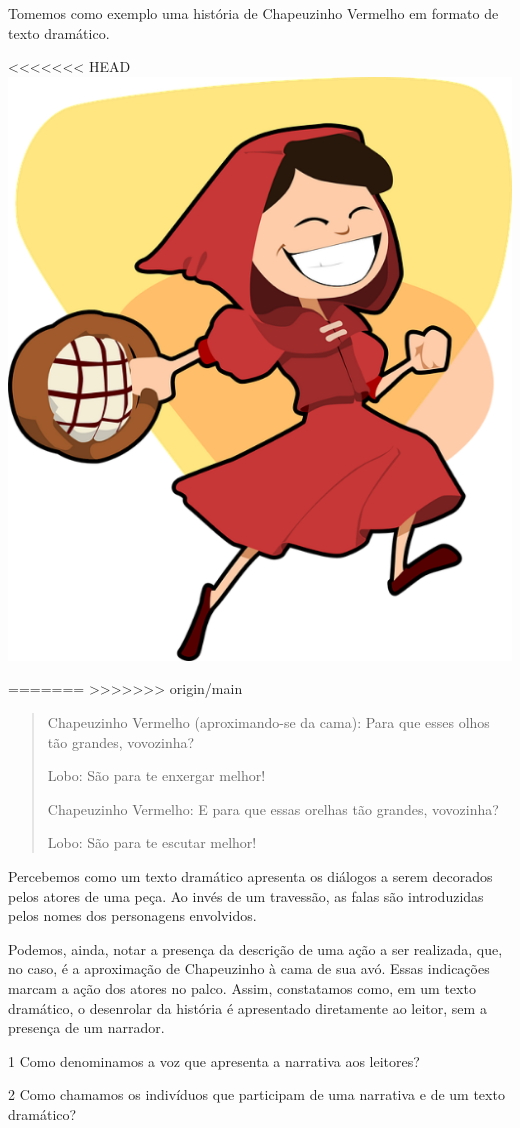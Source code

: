 {Tomemos como exemplo uma história de Chapeuzinho
Vermelho em formato de texto dramático.

<<<<<<< HEAD
\includegraphics[width=.5\textwidth]{./imgs/img5.png}

=======
>>>>>>> origin/main
\begin{quote}
Chapeuzinho Vermelho (aproximando-se da cama): Para que esses olhos
tão grandes, vovozinha?

Lobo: São para te enxergar melhor!

Chapeuzinho Vermelho: E para que essas orelhas tão grandes, vovozinha?

Lobo: São para te escutar melhor!
\end{quote}

Percebemos como um texto dramático apresenta os diálogos a serem
decorados pelos atores de uma peça. Ao invés de um travessão, as falas são introduzidas pelos nomes dos personagens envolvidos.

Podemos, ainda, notar a presença da descrição de uma ação a ser realizada, que,
no caso, é a aproximação de Chapeuzinho à cama de sua avó. Essas indicações marcam a ação dos atores no palco. Assim,
constatamos como, em um texto dramático, o desenrolar da história é
apresentado diretamente ao leitor, sem a presença de um narrador.}


\num{1} Como denominamos a voz que apresenta a narrativa aos leitores?


\num{2} Como chamamos os indivíduos que participam de uma narrativa e de um
texto dramático?

